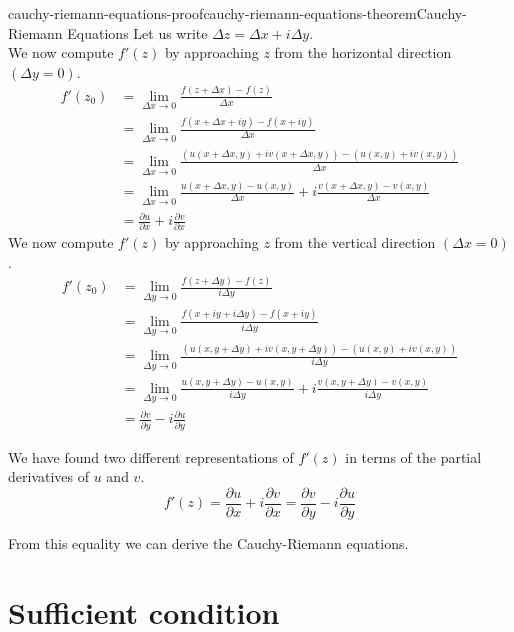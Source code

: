 \documentclass[preview]{standalone}
\begin{document}
\begin{snippetproof}{cauchy-riemann-equations-proof}{cauchy-riemann-equations-theorem}{Cauchy-Riemann Equations}
    Let us write \(\Delta z = \Delta x + i\Delta y\). \\
    We now compute \(f'(z)\) by approaching \(z\) from the
    horizontal direction \((\Delta y=0)\).
    \begin{align*}
        f'(z_0) &= \lim_{\Delta x \to 0} \frac{f(z + \Delta x) - f(z)}{\Delta x} \\
        &= \lim_{\Delta x \to 0}
        \frac{f(x + \Delta x + iy) - f(x + iy)}{\Delta x} \\
        &= \lim_{\Delta x \to 0}
        \frac{(u(x + \Delta x, y) + iv(x + \Delta x, y)) - (u(x,y)+iv(x,y))}{\Delta x} \\
        &= \lim_{\Delta x \to 0}
        \frac{u(x + \Delta x, y) - u(x,y)}{\Delta x} + i\frac{v(x + \Delta x, y) - v(x,y)}{\Delta x} \\
        &= \frac{\partial u}{\partial x} + i \frac{\partial v}{\partial x}
    \end{align*}
    We now compute \(f'(z)\) by approaching \(z\) from the
    vertical direction \((\Delta x=0)\).
    \begin{align*}
        f'(z_0) &= \lim_{\Delta y \to 0} \frac{f(z + \Delta y) - f(z)}{i\Delta y} \\
        &= \lim_{\Delta y \to 0}
        \frac{f(x + iy + i\Delta y) - f(x + iy)}{i\Delta y} \\
        &= \lim_{\Delta y \to 0}
        \frac{(u(x, y + \Delta y) + iv(x, y + \Delta y)) - (u(x,y)+iv(x,y))}{i\Delta y} \\
        &= \lim_{\Delta y \to 0}
        \frac{u(x, y + \Delta y) - u(x,y)}{i\Delta y} + i\frac{v(x, y + \Delta y) - v(x,y)}{i\Delta y} \\
        &= \frac{\partial v}{\partial y} -i\frac{\partial u}{\partial y}
    \end{align*}
    
    We have found two different representations of \(f'(z)\) in terms
    of the partial derivatives of \(u\) and \(v\).
    \[
        f'(z)=\frac{\partial u}{\partial x} +i\frac{\partial v}{\partial x}
        = \frac{\partial v}{\partial y} -i \frac{\partial u}{\partial y}
    \]
    
    From this equality we can derive the Cauchy-Riemann equations.
\end{snippetproof}

\section{Sufficient condition}
\end{document}
